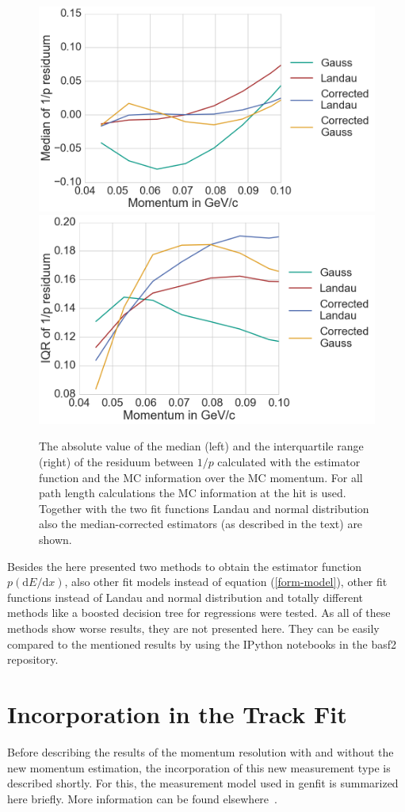 \begin{figure}
  \centering
   \includegraphics[width=0.48\linewidth]{figures/vxd/divPMedian.png}
   \includegraphics[width=0.48\linewidth]{figures/vxd/divPIQR.png}
  \caption[Median and IQR of $1/p$.]{The absolute value of the median (left) and the interquartile range (right) of the residuum between $1/p$ calculated with the estimator function and the MC information over the MC momentum. For all path length calculations the MC information at the hit is used. Together with the two fit functions Landau and normal distribution also the median-corrected estimators (as described in the text) are shown.}
  \label{fig-divp-residuum}
\end{figure}


Besides the here presented two methods to obtain the estimator function $p(\mathrm dE/\mathrm dx)$, also other fit models instead of equation (\ref{form-model}), other fit functions instead of Landau and normal distribution and totally different methods like a boosted decision tree for regressions were tested. As all of these methods show worse results, they are not presented here. They can be easily compared to the mentioned results by using the IPython notebooks in the basf2 repository.

\section{Incorporation in the Track Fit}

Before describing the results of the momentum resolution with and without the new momentum estimation, the incorporation of this new measurement type is described shortly. For this, the measurement model used in genfit is summarized here briefly. More information can be found elsewhere~\cite{genfit}.

